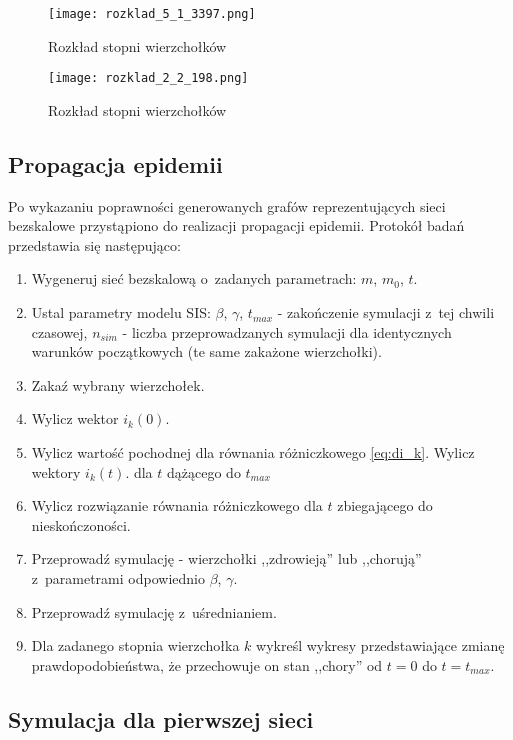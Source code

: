 \begin{enumerate}
\begin{figure}[H]
\centering
\texttt{[image: rozklad\_5\_1\_3397.png]}
\caption{\small Rozkład stopni wierzchołków}
\label{fig:rozklad_5_1_3397}
\end{figure}

\begin{figure}[H]
\centering
\texttt{[image: rozklad\_2\_2\_198.png]}
\caption{\small Rozkład stopni wierzchołków}
\label{fig:rozklad_2_2_198}
\end{figure}

\subsection{Propagacja epidemii}
\label{subsec:propagacja_epidemii}

Po wykazaniu poprawności generowanych grafów reprezentujących sieci bezskalowe przystąpiono do realizacji propagacji epidemii. Protokół badań przedstawia się następująco:
\begin{enumerate}
\item Wygeneruj sieć bezskalową o~zadanych parametrach: $m$, $m_0$, $t$.
\item Ustal parametry modelu SIS: $\beta$, $\gamma$, $t_{max}$ - zakończenie symulacji z~tej chwili czasowej, $n_{sim}$ - liczba przeprowadzanych symulacji dla identycznych warunków początkowych (te same zakażone wierzchołki).
\item Zakaź wybrany wierzchołek.
\item Wylicz wektor $i_k(0)$.
\item Wylicz wartość pochodnej dla równania różniczkowego \ref{eq:di_k}. Wylicz wektory $i_k(t)$. dla $t$ dążącego do $t_{max}$
\item Wylicz rozwiązanie równania różniczkowego dla $t$ zbiegającego do nieskończoności.
\item Przeprowadź symulację - wierzchołki ,,zdrowieją'' lub ,,chorują'' z~parametrami odpowiednio $\beta$, $\gamma$.
\item Przeprowadź symulację z~uśrednianiem.
\item Dla zadanego stopnia wierzchołka $k$ wykreśl wykresy przedstawiające zmianę prawdopodobieństwa, że przechowuje on stan ,,chory'' od $t=0$ do $t=t_{max}$.
\end{enumerate}

\subsection{Symulacja dla pierwszej sieci}
\label{subsec:sym_pierwsza_siec}


\end{enumerate}

